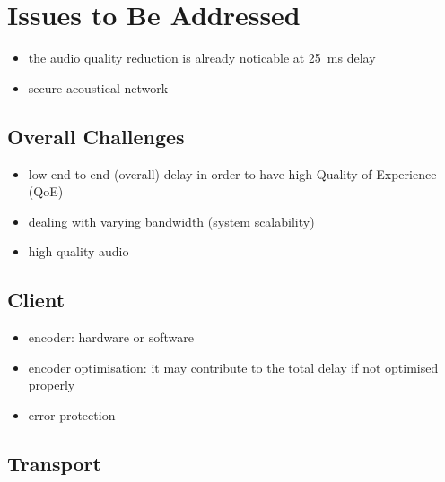 \documentclass[a4paper,12pt]{article}
\begin{document}
{%

\section{Issues to Be Addressed}
\begin{itemize}
  \item the audio quality reduction is already noticable at \SI{25}{\milli\second} delay
  \item secure acoustical network
\end{itemize}

\subsection{Overall Challenges}
\begin{itemize}
    \item low end-to-end (overall) delay in order to have high Quality of Experience (QoE)
    \item dealing with varying bandwidth (system scalability)
    \item high quality audio
\end{itemize}

\subsection{Client}
\begin{itemize}
    \item encoder: hardware or software
    \item encoder optimisation: it may contribute to the total delay if not optimised properly
    \item error protection
\end{itemize}
\subsection{Transport}

}
\end{document}
